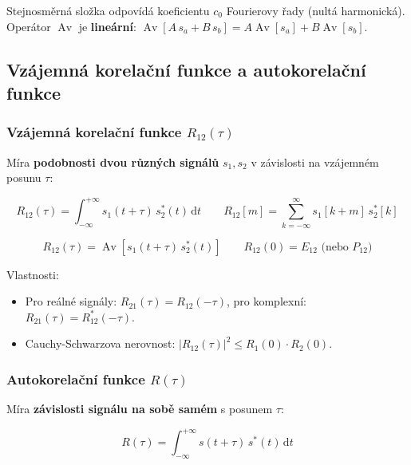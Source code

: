 \documentclass[12pt,a4paper]{article}
\newcommand{\Av}{\operatorname{Av}}
\newcommand{\dd}{\mathrm{d}}
\begin{document}
Stejnosměrná složka odpovídá koeficientu $c_0$ Fourierovy řady (nultá harmonická).\\
Operátor $\Av$ je \textbf{lineární}: $\Av[A\,s_a + B\,s_b] = A\Av[s_a] + B\Av[s_b]$.

\begin{hvezdBox}
\subsection*{Vzájemná korelační funkce a autokorelační funkce}
\end{hvezdBox}

\subsubsection*{Vzájemná korelační funkce $R_{12}(\tau)$}

Míra \textbf{podobnosti dvou různých signálů} $s_1, s_2$ v závislosti na vzájemném posunu $\tau$:

\begin{matBox}
\[
  R_{12}(\tau) = \int_{-\infty}^{+\infty} s_1(t+\tau)\,s_2^*(t)\,\dd t
  \qquad
  R_{12}[m] = \sum_{k=-\infty}^{\infty} s_1[k+m]\,s_2^*[k]
\]
\end{matBox}

\begin{matBox}
\[
  R_{12}(\tau) = \Av[s_1(t+\tau)\,s_2^*(t)]
  \qquad
  R_{12}(0) = E_{12} \text{ (nebo } P_{12}\text{)}
\]
\end{matBox}

Vlastnosti:
\begin{itemize}
  \item Pro reálné signály: $R_{21}(\tau) = R_{12}(-\tau)$, pro komplexní: $R_{21}(\tau) = R_{12}^*(-\tau)$.
  \item Cauchy-Schwarzova nerovnost: $|R_{12}(\tau)|^2 \leq R_1(0)\cdot R_2(0)$.
\end{itemize}

\subsubsection*{Autokorelační funkce $R(\tau)$}

Míra \textbf{závislosti signálu na sobě samém} s posunem $\tau$:

\begin{matBox}
\[
  R(\tau) = \int_{-\infty}^{+\infty} s(t+\tau)\,s^*(t)\,\dd t
\]
\end{matBox}
\end{document}
